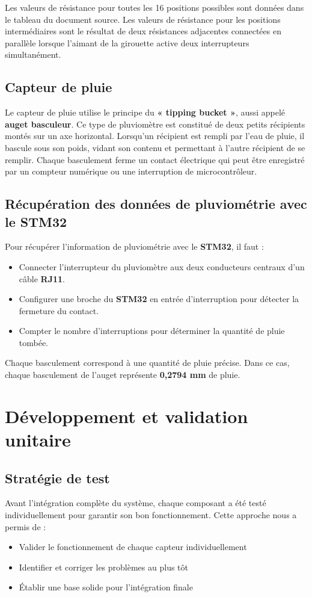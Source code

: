 \documentclass[12pt]{article}
\begin{document}
Les valeurs de résistance pour toutes les 16 positions possibles sont données dans le tableau du document source. Les valeurs de résistance pour les positions intermédiaires sont le résultat de deux résistances adjacentes connectées en parallèle lorsque l'aimant de la girouette active deux interrupteurs simultanément.

\subsection{Capteur de pluie}
Le capteur de pluie utilise le principe du \textbf{« tipping bucket »}, aussi appelé \textbf{auget basculeur}. Ce type de pluviomètre est constitué de deux petits récipients montés sur un axe horizontal. Lorsqu'un récipient est rempli par l'eau de pluie, il bascule sous son poids, vidant son contenu et permettant à l'autre récipient de se remplir. Chaque basculement ferme un contact électrique qui peut être enregistré par un compteur numérique ou une interruption de microcontrôleur.

\subsection*{Récupération des données de pluviométrie avec le STM32}

Pour récupérer l'information de pluviométrie avec le \textbf{STM32}, il faut :
\begin{itemize}
    \item Connecter l'interrupteur du pluviomètre aux deux conducteurs centraux d'un câble \textbf{RJ11}.
    \item Configurer une broche du \textbf{STM32} en entrée d'interruption pour détecter la fermeture du contact.
    \item Compter le nombre d'interruptions pour déterminer la quantité de pluie tombée.
\end{itemize}

Chaque basculement correspond à une quantité de pluie précise. Dans ce cas, chaque basculement de l'auget représente \textbf{0,2794 mm} de pluie.
\newpage

\section{Développement et validation unitaire}

\subsection{Stratégie de test}
Avant l'intégration complète du système, chaque composant a été testé individuellement pour garantir son bon fonctionnement. Cette approche nous a permis de :
\begin{itemize}
    \item Valider le fonctionnement de chaque capteur individuellement
    \item Identifier et corriger les problèmes au plus tôt
    \item Établir une base solide pour l'intégration finale
\end{itemize}
\end{document}
